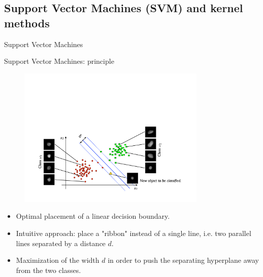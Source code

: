 \documentclass[xcolor=pdftex,dvipsnames,table]{beamer}
\begin{document}
\subsection{Support Vector Machines (SVM) and kernel methods}
\begin{frame}[plain,c]
\begin{center}
\Huge Support Vector Machines
\end{center}
\end{frame}

\begin{frame}{Support Vector Machines: principle}
	\begin{figure}[htb]
		\includegraphics[width=0.8\textwidth]{../graphics/SVM1.pdf}
	\end{figure}
	\begin{itemize}
		\item Optimal placement of a linear decision boundary.
		\item Intuitive approach: place a "ribbon" instead of a single line, i.e. two parallel lines separated by a distance $d$.
		\item Maximization of the width $d$ in order to push the separating hyperplane away from the two classes.
	\end{itemize}
\end{frame}
\end{document}
